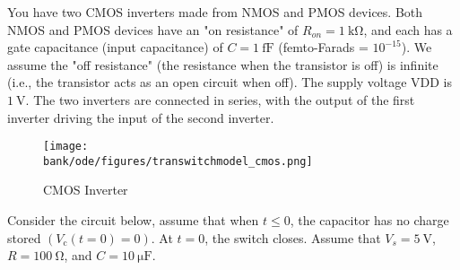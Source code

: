 
You have two CMOS inverters made from NMOS and PMOS devices. Both NMOS and PMOS devices
have an "on resistance" of $R_{on}=\SI{1}{\kilo\ohm}$, and each has a gate capacitance (input capacitance) of $C=\SI{1}{\femto\farad}$
(femto-Farads = $10^{−15}$). We assume the "off resistance" (the resistance when the transistor is off) is infinite
(i.e., the transistor acts as an open circuit when off). The supply voltage VDD is $\SI{1}{\volt}$. The two inverters are
connected in series, with the output of the first inverter driving the input of the second inverter.
\begin{figure} [h!]
	\centering
	\texttt{[image: \\bank/ode/figures/transwitchmodel\_cmos.png]}
	\caption{CMOS Inverter}
	\label{fig:cmos}
\end{figure}

Consider the circuit below, assume that when $t\leq0$, the capacitor has no charge stored $(V_{\text{c}}(t=0) = 0)$. At $t=0$, the switch closes. Assume that $V_s=\SI{5}{\volt}$, $R=\SI{100}{\ohm}$, and $C=\SI{10}{\micro\farad}$. 



